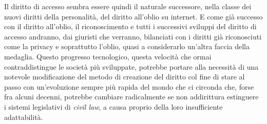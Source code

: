 Il diritto di accesso sembra essere quindi il naturale successore, nella classe dei nuovi diritti della personalità, del diritto all'oblio su internet. 
E come già successo con il diritto all'oblio, il riconoscimento e tutti i successivi sviluppi del diritto di accesso andranno, dai giuristi che verranno, bilanciati con i diritti già riconosciuti come la privacy e soprattutto l'oblio, quasi a considerarlo un'altra faccia della medaglia.
Questo progresso tecnologico, questa velocità che ormai contraddistingue le società più sviluppate, potrebbe portare alla necessità di una notevole modificazione del metodo di creazione del diritto col fine di stare al passo con un'evoluzione sempre più rapida del mondo che ci circonda che, forse fra alcuni decenni, potrebbe cambiare radicalmente se non addirittura estinguere i sistemi legislativi di \textit{civil law}, a causa proprio della loro insufficiente adattabilità.



